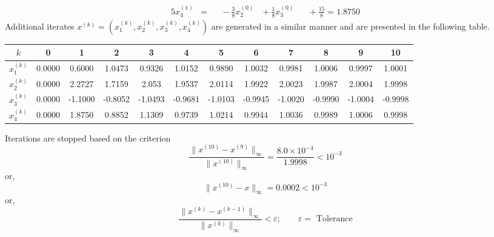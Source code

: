 \documentclass[../main-sheet.tex]{subfiles}
\begin{document}
\begin{ex}
\begin{alignat*}{5}
        x_4^{(1)} & {}={} & & {}-{} \frac{3}{8}x_2^{(0)} & {}+{} \frac{1}{8}x_3^{(0)} & & {}+{} \frac{15}{8}=1.8750
    \end{alignat*}
    Additional iterates \(x^{(k)}=(x_1^{(k)},x_2^{(k)},x_3^{(k)},x_4^{(k)})\) are generated in a similar manner and are presented in the following table.
    \begin{table}[H]
        \begin{tabular}{cccccccccccc}
        \toprule
        \(k\)  & 0      & 1       & 2       & 3       & 4       & 5       & 6       & 7       & 8       & 9       & 10      \\ \midrule
        \(x_1^{(k)}\) & 0.0000  & 0.6000  & 1.0473  & 0.9326  & 1.0152  & 0.9890  & 1.0032  & 0.9981  & 1.0006  & 0.9997  & 1.0001  \\
        \(x_2^{(k)}\) & 0.0000 & 2.2727  & 1.7159  & 2.053   & 1.9537 & 2.0114 & 1.9922 & 2.0023  & 1.9987 & 2.0004  & 1.9998 \\
        \(x_3^{(k)}\) & 0.0000 & -1.1000 & -0.8052 & -1.0493 & -0.9681 & -1.0103 & -0.9945 & -1.0020 & -0.9990 & -1.0004 & -0.9998 \\
        \(x_4^{(k)}\) & 0.0000 & 1.8750  & 0.8852  & 1.1309  & 0.9739  & 1.0214  & 0.9944  & 1.0036 & 0.9989  & 1.0006 & 0.9998  \\ \bottomrule
        \end{tabular}
        \end{table}
        Iterations are stopped based on the criterion
        \[\frac{\|x^{(10)}-x^{(9)}\|_\infty}{\|x^{(10)}\|_\infty}=\frac{8.0\times 10^{-4}}{1.9998}<10^{-3}\]
        or,
        \[\|x^{(10)}-x\|_\infty=0.0002<10^{-3}\]
        or,
        \[\frac{\|x^{(k)}-x^{(k-1)}\|_\infty}{\|x^{(k)}\|_\infty}<\varepsilon;\qquad \varepsilon=\text{ Tolerance}\]

\end{ex}
\end{document}
